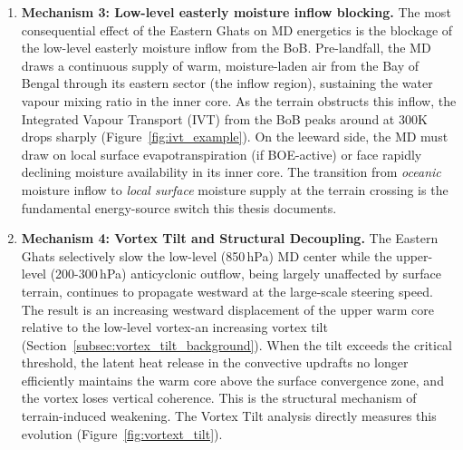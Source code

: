 \begin{enumerate}
  \item \textbf{Mechanism 3: Low-level easterly moisture inflow
    blocking.} The most consequential effect of the Eastern Ghats on
    MD energetics is the blockage of the low-level easterly moisture
    inflow from the BoB. Pre-landfall, the MD draws a continuous
    supply of warm, moisture-laden air from the Bay of Bengal through
    its eastern sector (the inflow region), sustaining the water
    vapour mixing ratio in the inner core. As the terrain obstructs
    this inflow, the Integrated Vapour Transport (IVT) from the BoB
    peaks around at 300K drops sharply (Figure~\ref{fig:ivt_example}).
    On the leeward side, the MD must draw on local surface
    evapotranspiration (if BOE-active) or face rapidly declining
    moisture availability in its inner core.
    The transition from \emph{oceanic} moisture inflow to \emph{local
    surface} moisture supply at the terrain crossing is the fundamental
    energy-source switch this thesis documents.
  \item \textbf{Mechanism 4: Vortex Tilt and Structural Decoupling.}
    The Eastern Ghats selectively slow the low-level (850\,hPa) MD
    center while the upper-level (200-300\,hPa) anticyclonic outflow,
    being largely unaffected by surface terrain, continues to
    propagate westward at the large-scale steering speed. The result
    is an increasing westward displacement of the upper warm core
    relative to the low-level vortex-an increasing vortex tilt
    (Section~\ref{subsec:vortex_tilt_background}). When the tilt
    exceeds the critical threshold, the latent heat release in the
    convective updrafts no longer efficiently maintains the warm core
    above the surface convergence zone, and the vortex loses vertical
    coherence. This is the structural mechanism of terrain-induced
    weakening. The Vortex Tilt analysis directly measures this
    evolution (Figure~\ref{fig:vortext_tilt}).
\end{enumerate}

